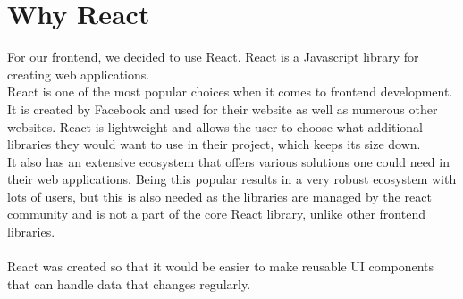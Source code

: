 \section{Why React}
For our frontend, we decided to use React.
React is a Javascript library for creating web applications\cite{ReactJS}. 
\\
React is one of the most popular choices when it comes to frontend development\cite{NPMVueReactAngular}.
It is created by Facebook and used for their website as well as numerous other websites\cite{ReactHistory}.
React is lightweight and allows the user to choose what additional libraries they would want to use in their project, which keeps its size down.
\\
It also has an extensive ecosystem that offers various solutions one could need in their web applications.
Being this popular results in a very robust ecosystem with lots of users, but this is also needed as the libraries are managed by the react community and is not a part of the core React library, unlike other frontend libraries\cite{Vue}.
\\\\
React was created so that it would be easier to make reusable UI components that can handle data that changes regularly\cite{ReactHistory}.
\\



